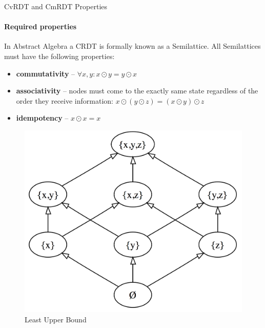 \documentclass{beamer}
\begin{document}
\begin{frame}{CvRDT and CmRDT Properties}
\framesubtitle{Required properties}

In Abstract Algebra a CRDT is formally known as a Semilattice.
All Semilattices must have the following properties:

\begin{itemize}
	\item \textbf{commutativity} – $\forall x, y : x \odot y = y \odot x$
	\item \textbf{associativity} – nodes must come to the exactly same state regardless of the order they receive information: $x \odot (y \odot z) = (x \odot y) \odot z$
	\item \textbf{idempotency} – $x \odot x = x$
\end{itemize}

\begin{figure}[!ht]
	\includegraphics[scale=0.15]{LUB.png}    
	\caption{Least Upper Bound}
\end{figure}

\end{frame}


\end{document}
